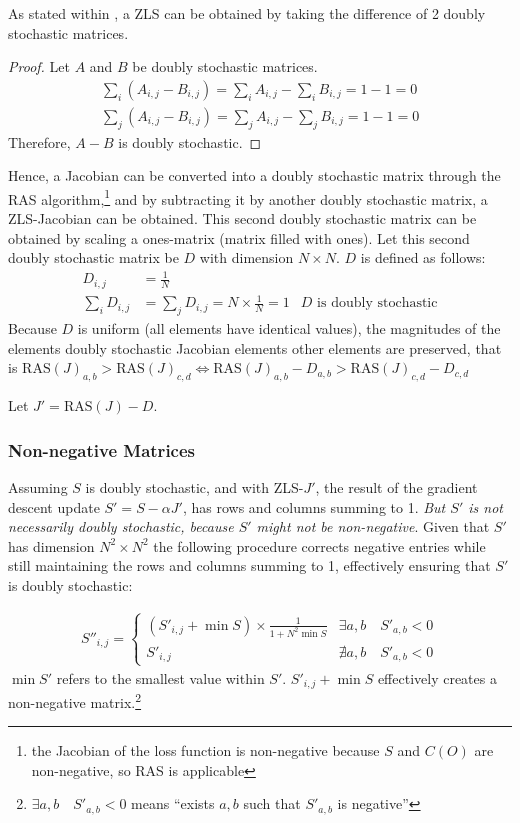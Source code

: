 As stated within \cite{zeroLineSum}, a ZLS can be obtained by taking the difference of 2 doubly stochastic matrices.
\begin{proof}
    Let $A$ and $B$ be doubly stochastic matrices.
    \begin{align*}
        \sum_i \left(A_{i,j}-B_{i,j}\right)= \sum_i A_{i,j}-\sum_i B_{i,j}=1-1=0\\
        \sum_j \left(A_{i,j}-B_{i,j}\right)= \sum_j A_{i,j}-\sum_j B_{i,j}=1-1=0
    \end{align*}
    Therefore, $A-B$ is doubly stochastic.
\end{proof}

Hence, a Jacobian can be converted into a doubly stochastic matrix through the RAS algorithm,\footnote{the Jacobian of the loss function is non-negative because $S$ and $C(O)$ are non-negative, so RAS is applicable} and by subtracting it by another doubly stochastic matrix, a ZLS-Jacobian can be obtained. This second doubly stochastic matrix can be obtained by scaling a ones-matrix (matrix filled with ones). Let this second doubly stochastic matrix be $D$ with dimension $N\times N$. $D$ is defined as follows:
\begin{align*}
    D_{i,j}&=\frac{1}{N}\\
    \sum_i D_{i,j}&=\sum_j D_{i,j}=N\times \frac{1}{N}=1 &\text{$D$ is doubly stochastic}
\end{align*}
Because $D$ is uniform (all elements have identical values), the magnitudes of the elements doubly stochastic Jacobian elements \wrt{} other elements are preserved, that is $\text{RAS}(J)_{a,b}>\text{RAS}(J)_{c,d} \iff \text{RAS}(J)_{a,b}-D_{a,b}>\text{RAS}(J)_{c,d}-D_{c,d}$

Let $J'=\text{RAS}(J)-D$.

\subsubsection{Non-negative Matrices}%
\label{ssub:non_negative_matrices}
Assuming $S$ is doubly stochastic, and with ZLS-$J'$, the result of the gradient descent update $S'=S-\alpha J'$, has rows and columns summing to 1. \emph{But $S'$ is not necessarily doubly stochastic, because $S'$ might not be non-negative}. Given that $S'$ has dimension $N^2\times N^2$ the following procedure corrects negative entries while still maintaining the rows and columns summing to 1, effectively ensuring that $S'$ is doubly stochastic:

\begin{align*}
 S''_{i,j}=
\begin{cases}
    (S'_{i,j}+\min{S})\times \frac{1}{1+N^2 \min{S}} & \exists a,b\quad S'_{a,b}<0\\
    S'_{i,j} & \nexists a,b\quad S'_{a,b}<0
\end{cases}
\end{align*}
$\min{S'}$ refers to the smallest value within $S'$. $S'_{i,j}+\min{S}$ effectively creates a non-negative matrix.\footnote{$\exists a,b\quad S'_{a,b}<0$ means ``exists $a,b$ such that $S'_{a,b}$ is negative''}

